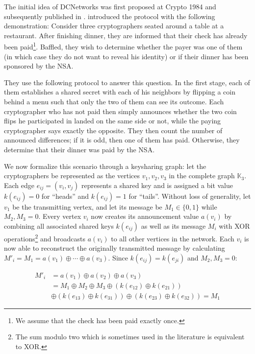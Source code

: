 The initial idea of \acp{DCNetwork} was first proposed
at Crypto 1984 and subsequently published in \citeyear{journals/joc/Chaum88} \cite{journals/joc/Chaum88}.
\citeauthor{journals/joc/Chaum88} introduced the protocol with the following demonstration:
Consider three cryptographers seated around a table at a restaurant.
After finishing dinner, they are informed that their check has already been paid\footnote{
We assume that the check has been paid exactly once.}.
Baffled, they wish to determine whether the payer was one of them (in which case
they do not want to reveal his identity) or if their dinner has been sponsored by the NSA.

They use the following protocol to answer this question.
In the first stage, each of them establishes a shared secret with each of his neighbors by flipping
a coin behind a menu such that only the two of them can see its outcome. 
Each cryptographer
who has not paid then simply announces whether the two coin flips he participated
in landed on the same side or not, while the paying cryptographer says exactly the opposite.
They then count the number of announced differences; if it is odd, then one of them has paid.
Otherwise, they determine that their dinner was paid by the NSA.

We now formalize this scenario through a keysharing graph: let the cryptographers be represented as the vertices 
$v_1, v_2, v_3$ in the complete graph $\mathbb{K}_3$. Each edge $e_{ij} = (v_i, v_j)$ represents a shared
key and is assigned a bit value $k(e_{ij}) = 0$ for ``heads'' and $k(e_{ij}) = 1$ for ``tails''. Without loss of generality,
let $v_1$ be the transmitting vertex, and let its message be $M_1 \in \{0, 1\}$ while $M_2, M_3 = 0$.
Every vertex $v_i$ now creates its announcement value $a(v_i)$ by combining all associated shared keys $k(e_{ij})$
as well as its message $M_i$ with XOR operations\footnote{
The sum modulo two which is sometimes used in the literature is equivalent to XOR.}
and broadcasts $a(v_i)$ to all other vertices in the network. Each $v_i$ is now able to
reconstruct the originally transmitted message by calculating
$M'_i = M_1 = a(v_1) \oplus \cdots \oplus a(v_3)$. Since $k(e_{ij}) = k(e_{ji})$ and $M_2, M_3 = 0$:

\begin{align*}
M'_i &= a(v_1) \oplus a(v_2) \oplus a(v_3) \\
     &= M_1 \oplus M_2 \oplus M_3
     \oplus (k(e_{12}) \oplus k(e_{21})) \\
     & \oplus (k(e_{13}) \oplus k(e_{31})) 
     \oplus (k(e_{23}) \oplus k(e_{32})) = M_1
\end{align*}

